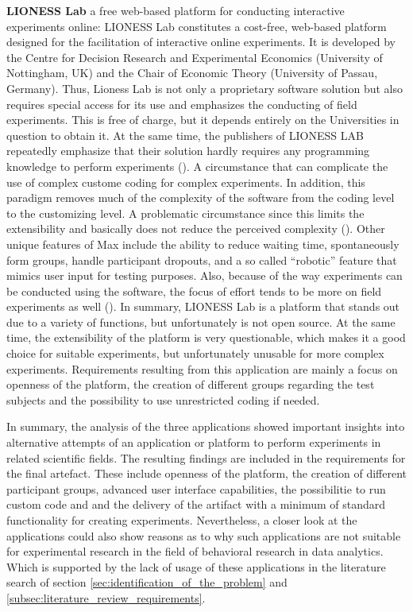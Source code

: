 \textbf{LIONESS Lab} a free web-based platform for conducting interactive experiments online:
LIONESS Lab constitutes a cost-free, web-based platform designed for the facilitation of interactive online experiments. It is developed by the Centre for Decision Research and Experimental Economics (University of Nottingham, UK) and the Chair of Economic Theory (University of Passau, Germany). Thus, Lioness Lab is not only a proprietary software solution but also requires special access for its use and emphasizes the conducting of field experiments. This is free of charge, but it depends entirely on the Universities in question to obtain it. At the same time, the publishers of LIONESS LAB repeatedly emphasize that their solution hardly requires any programming knowledge to perform experiments (\cite{Giamattei.2020}). A circumstance that can complicate the use of complex custome coding for complex experiments. In addition, this paradigm removes much of the complexity of the software from the coding level to the customizing level. A problematic circumstance since this limits the extensibility and basically does not reduce the perceived complexity (\cite{Chou.2008}). Other unique features of Max include the ability to reduce waiting time, spontaneously form groups, handle participant dropouts, and a so called \enquote{robotic} feature that mimics user input for testing purposes. Also, because of the way experiments can be conducted using the software, the focus of effort tends to be more on field experiments as well (\cite{Giamattei.2020}). In summary, LIONESS Lab is a platform that stands out due to a variety of functions, but unfortunately is not open source. At the same time, the extensibility of the platform is very questionable, which makes it a good choice for suitable experiments, but unfortunately unusable for more complex experiments. Requirements resulting from this application are mainly a focus on openness of the platform, the creation of different groups regarding the test subjects and the possibility to use unrestricted coding if needed.

In summary, the analysis of the three applications showed important insights into alternative attempts of an application or platform to perform experiments in related scientific fields. The resulting findings are included in the requirements for the final artefact. These include openness of the platform, the creation of different participant groups, advanced user interface capabilities, the possibilitie to run custom code and and the delivery of the artifact with a minimum of standard functionality for creating experiments.  Nevertheless, a closer look at the applications could also show reasons as to why such applications are not suitable for experimental research in the field of behavioral research in data analytics. Which is supported by the lack of usage of these applications in the literature search of section \ref{sec:identification_of_the_problem} and \ref{subsec:literature_review_requirements}.


